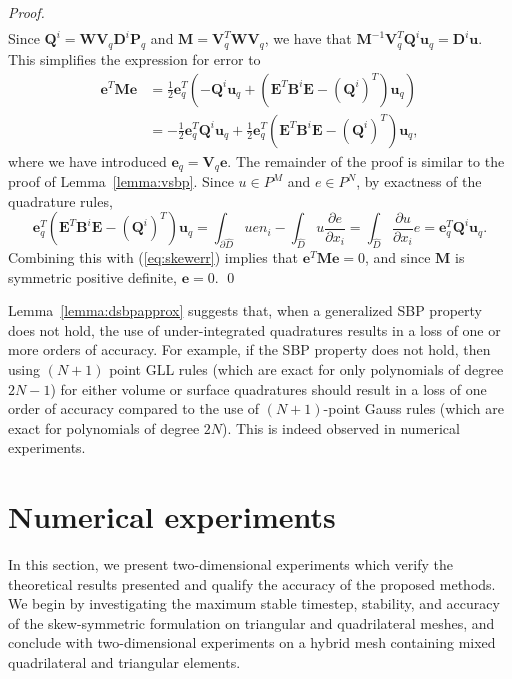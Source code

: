 \documentclass{svjour3}                     %
\renewcommand{\hat}{\widehat}
\newcommand{\pd}[2]{\frac{\partial#1}{\partial#2}}
\newcommand{\LRp}[1]{\left( #1 \right)}
\begin{document}
\begin{proof}
\begin{align*}
\end{align*}
Since $\bm{Q}^i = \bm{W}\bm{V}_q\bm{D}^i\bm{P}_q$ and $\bm{M} = \bm{V}_q^T\bm{W}\bm{V}_q$, we have that $\bm{M}^{-1}\bm{V}_q^T\bm{Q}^i\bm{u}_q = \bm{D}^i\bm{u}$.  This simplifies the expression for error to
\begin{align}
\bm{e}^T\bm{M}\bm{e} &= \frac{1}{2}
\bm{e}_q^T\LRp{-\bm{Q}^i\bm{u}_q + \LRp{\bm{E}^T\bm{B}^i\bm{E} - \LRp{\bm{Q}^i}^T}\bm{u}_q} \label{eq:skewerr}\\
&= -\frac{1}{2}
\bm{e}_q^T\bm{Q}^i\bm{u}_q + \frac{1}{2}\bm{e}_q^T\LRp{\bm{E}^T\bm{B}^i\bm{E} - \LRp{\bm{Q}^i}^T}\bm{u}_q, \nonumber
\end{align}
where we have introduced $\bm{e}_q = \bm{V}_q\bm{e}$.  The remainder of the proof is similar to the proof of Lemma~\ref{lemma:vsbp}.  Since $u \in P^M$ and $e \in P^N$, by exactness of the quadrature rules, 
\[
\bm{e}_q^T\LRp{\bm{E}^T\bm{B}^i\bm{E} - \LRp{\bm{Q}^i}^T}\bm{u}_q = \int_{\partial \hat{D}} u e n_i - \int_{\hat{D}} u \pd{e}{x_i}
= \int_{\hat{D}} \pd{u}{x_i} e = \bm{e}_q^T\bm{Q}^i\bm{u}_q.
\]
Combining this with (\ref{eq:skewerr}) implies that $\bm{e}^T\bm{M}\bm{e} = 0$, and since $\bm{M}$ is symmetric positive definite, $\bm{e} = 0$.  
\qed\end{proof}

Lemma~\ref{lemma:dsbpapprox} suggests that, when a generalized SBP property does not hold, the use of under-integrated quadratures results in a loss of one or more orders of accuracy.  For example, if the SBP property does not hold, then using $(N+1)$ point GLL rules (which are exact for only polynomials of degree $2N-1$) for either volume or surface quadratures should result in a loss of one order of accuracy compared to the use of $(N+1)$-point Gauss rules (which are exact for polynomials of degree $2N$).  This is indeed observed in numerical experiments.  



\section{Numerical experiments}
\label{sec:num}

In this section, we present two-dimensional experiments which verify the theoretical results presented and qualify the accuracy of the proposed methods.  We begin by investigating the maximum stable timestep, stability, and accuracy of the skew-symmetric formulation on triangular and quadrilateral meshes, and conclude with two-dimensional experiments on a hybrid mesh containing mixed quadrilateral and triangular elements.  
\end{document}
